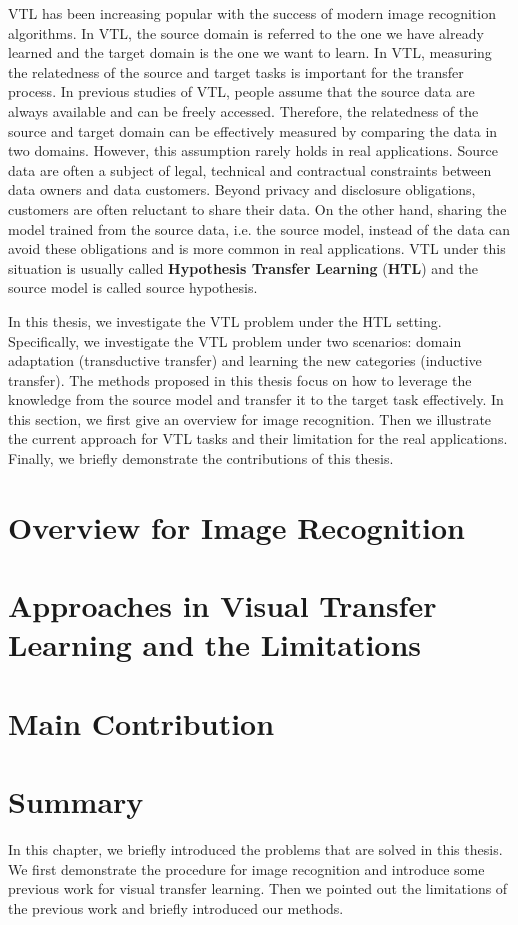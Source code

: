 VTL has been increasing popular with the success of modern image recognition algorithms. In VTL, the source domain is referred to the one we have already learned and the target domain is the one we want to learn. In VTL, measuring the relatedness of the source and target tasks is important for the transfer process.
In previous studies of VTL, people assume that the source data are always available and can be freely accessed. Therefore, the relatedness of the source and target domain can be effectively measured by comparing the data in two domains. However, this assumption rarely holds in real applications. Source data are often a subject of legal, technical and contractual constraints between data owners and data customers. Beyond privacy and disclosure obligations, customers are often reluctant to share their data. %
On the other hand, sharing the model trained from the source data, i.e. the source model, instead of the data can avoid these obligations and is more common in real applications. VTL under this situation is usually called \textbf{Hypothesis Transfer Learning} (\textbf{HTL}) \cite{kuzborskij2013stability} and the source model is called source hypothesis.

In this thesis, we investigate the VTL problem under the HTL setting. Specifically, we investigate the VTL problem under two scenarios: domain adaptation (transductive transfer) and learning the new categories (inductive transfer). The methods proposed in this thesis focus on how to leverage the knowledge from the source model and transfer it to the target task effectively. In this section, we first give an overview for image recognition. Then we illustrate the current approach for VTL tasks and their limitation for the real applications. Finally, we briefly demonstrate the contributions of this thesis. 

\section{Overview for Image Recognition}\label{sec:intro:over}

\section{Approaches in Visual Transfer Learning and the Limitations}

\section{Main Contribution}

\section{Summary}
In this chapter, we briefly introduced the problems that are solved in this thesis. We first demonstrate the procedure for image recognition and introduce some previous work for visual transfer learning. Then we pointed out the limitations of the previous work and briefly introduced our methods.